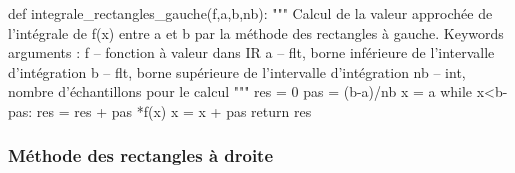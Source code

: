 \documentclass[10pt]{article}
\begin{document}
\begin{py}
\begin{python}
def integrale_rectangles_gauche(f,a,b,nb):
    """
    Calcul de la valeur approchée de l'intégrale de f(x) entre a et b par la 
    méthode des rectangles à gauche.
    Keywords arguments :
    f -- fonction à valeur dans IR
    a -- flt, borne inférieure de l'intervalle d'intégration
    b -- flt, borne supérieure de l'intervalle d'intégration
    nb -- int, nombre d'échantillons pour le calcul
    """
    res = 0
    pas = (b-a)/nb
    x = a
    while x<b-pas:
        res = res + pas *f(x)
        x = x + pas
    return res
\end{python}
\end{py}


\subsubsection{Méthode des rectangles à droite}
\end{document}
